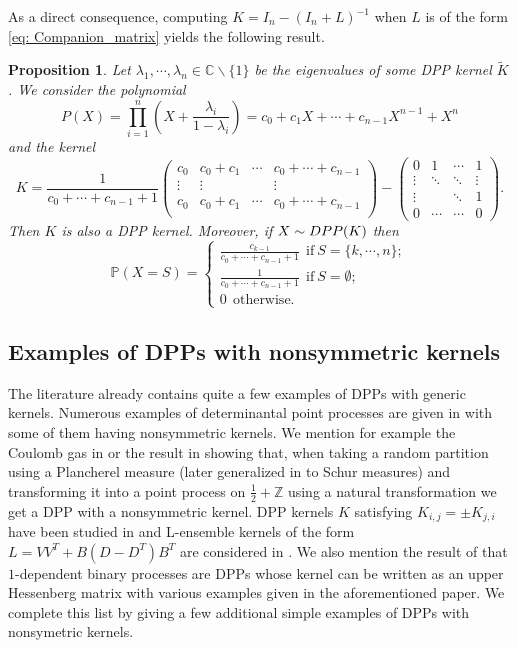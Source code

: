 \documentclass{article}
\numberwithin{equation}{section}
\renewcommand{\tilde}{\widetilde}
\newcommand{\DPP}{\textnormal{DPP}}
\theoremstyle{plain}
\newtheorem{proposition}{Proposition}[section]
\begin{document}
\noindent As a direct consequence, computing $K=I_n-(I_n+L)^{-1}$ when $L$ is of the form \eqref{eq: Companion_matrix} yields the following result.

\begin{proposition}\label{prop: Companion_matrix_K}
Let $\lambda_1,\cdots,\lambda_n\in\mathbb{C}\backslash\{1\}$ be the eigenvalues of some DPP kernel $\tilde K$. We consider the polynomial 
\[P(X)=\prod_{i=1}^n \left(X+\frac{\lambda_i}{1-\lambda_i}\right)=c_0+c_1X+\cdots+c_{n-1}X^{n-1}+X^n\]
and the kernel
\[K = \frac{1}{c_0+\cdots+c_{n-1}+1}\begin{pmatrix} c_0 & c_0+c_1 & \cdots & c_0+\cdots+c_{n-1}\\
\vdots & \vdots & & \vdots\\
c_0 & c_0+c_1 & \cdots & c_0+\cdots+c_{n-1}\\
\end{pmatrix} - \begin{pmatrix} 0  & 1 & \cdots & 1\\
\vdots & \ddots & \ddots & \vdots \\
\vdots & & \ddots & 1\\
0 & \cdots & \cdots & 0
\end{pmatrix}.\]
Then $K$ is also a DPP kernel. Moreover, if $X\sim \DPP(K)$ then
\[\mathbb{P}(X=S)=\left\{\begin{array}{l}
\displaystyle\frac{c_{k-1}}{c_0+\cdots+c_{n-1}+1}~~\mbox{if}~S=\{k,\cdots, n\};\\
\displaystyle\frac{1}{c_0+\cdots+c_{n-1}+1}~~\mbox{if}~S=\emptyset;\\
0~~\mbox{otherwise}.
\end{array}
\right.\]
\end{proposition}

\subsection{Examples of DPPs with nonsymmetric kernels}

The literature already contains quite a few examples of DPPs with generic kernels. Numerous examples of determinantal point processes are given in \cite[Section 2.5]{Soshnikov} with some of them having nonsymmetric kernels. We mention for example the Coulomb gas in \cite{Cornu} or the result in \cite{Borodin99} showing that, when taking a random partition using a Plancherel measure (later generalized in \cite{Okounkov} to Schur measures) and transforming it into a point process on $\frac{1}{2}+\mathbb{Z}$ using a natural transformation we get a DPP with a nonsymmetric kernel. DPP kernels $K$ satisfying $K_{i, j}= \pm K_{j, i}$ have been studied in \cite{Brunel18} and L-ensemble kernels of the form $L=VV^T + B(D-D^T)B^T$ are considered in \cite{Gartrell21, Han, Han22}. We also mention the result of \cite{Borodin09} that $1$-dependent binary processes are DPPs whose kernel can be written as an upper Hessenberg matrix with various examples given in the aforementioned paper. We complete this list by giving a few additional simple examples of DPPs with nonsymetric kernels.
\end{document}
